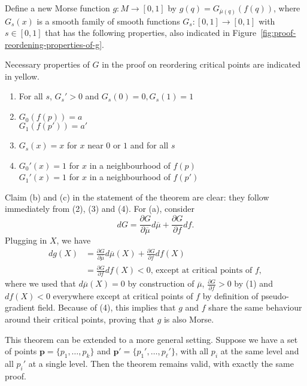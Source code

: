 \begin{myproof}
    Define a new Morse function $g: M \to  [0,1]$ by $g(q) = G_{\overline{\mu}(q)}(f(q))$, where $G_{s}(x)$ is a smooth family of smooth functions $G_s: [0,1] \to  [0,1]$ with $s \in [0,1]$ that has the following properties, also indicated in Figure~\ref{fig:proof-reordening-properties-of-g}.
    \begin{marginfigure}
        \centering
        \caption{Necessary properties of $G$ in the proof on reordering critical points are indicated in yellow.}
        \label{fig:proof-reordening-properties-of-g}
    \end{marginfigure}
    \begin{enumerate}[(1)]
        \item For all $s$, $G_s' > 0$ and $G_s(0) = 0, G_s(1) = 1$
        \item  $G_0(f(p)) = a$\\ $G_1(f(p')) = a'$
        \item  $G_s(x) = x$ for $x$ near  $0$ or  $1$ and for all $s$ 
        \item  $G_0'(x) = 1$ for $x$  in a neighbourhood of $f(p)$\\
        $G_1'(x) = 1$ for $x$  in a neighbourhood of $f(p')$
    \end{enumerate}
    Claim (b) and (c) in the statement of the theorem are clear: they follow immediately from (2), (3) and (4).
    For (a), consider
    \[
        dG = \frac{\partial G}{\partial \overline{\mu}}  d\overline{\mu} + \frac{\partial G}{\partial f}  df
    .\] 
    Plugging in $X$, we have
    \begin{align*}
        dg(X) &= \frac{\partial G}{\partial \overline{\mu}}  d\overline{\mu}(X) + \frac{\partial G}{\partial f}  df(X)\\
              &= \frac{\partial G}{\partial f}  df(X) < 0 \text{, except at critical points of $f$}
    ,\end{align*} 
    where we used that $d\overline{\mu}(X) = 0$ by construction of $\overline{\mu}$, $\frac{\partial G}{\partial f} > 0$ by (1) and $df(X) < 0$ everywhere except at critical points of $f$ by definition of pseudo-gradient field.
    Because of (4), this implies that $g$ and $f$ share the same behaviour around their critical points, proving that $g$ is also Morse.
\end{myproof}

\begin{remark}
    This theorem can be extended to a more general setting. Suppose we have a set of points $\mathbf{p} = \{p_1, \ldots, p_k\}$ and $\mathbf{p}' = \{p_1', \ldots, p_\ell'\}$, with all $p_i$ at the same level and all $p_i'$ at a single level.
    Then the theorem remains valid, with exactly the same proof.
\end{remark}

